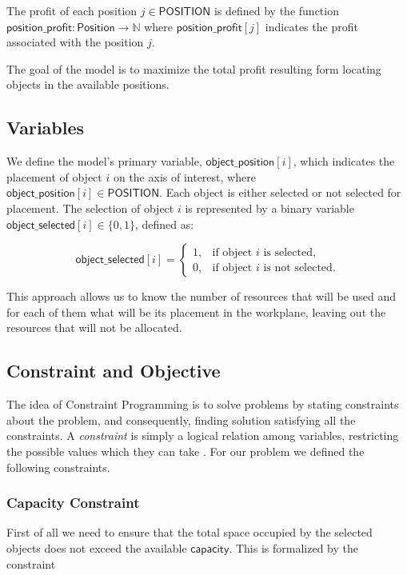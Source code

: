\documentclass[runningheads]{llncs}
\begin{document}
The profit of each position \(j \in \mathsf{POSITION}\) is defined by the function \\\(\mathsf{position\_profit} \colon \mathsf{Position} \to \mathbb{N}\) where \(\mathsf{position\_profit}[j]\) indicates the profit associated with the position \(j\).

The goal of the model is to maximize the total profit resulting form locating objects in the available positions.

\subsection{Variables}

We define the model's primary variable, \(\mathsf{object\_position}[i]\), which indicates the placement of object \(i\) on the axis of interest, where \(\mathsf{object\_position}[i] \in \mathsf{POSITION}\). Each object is either selected or not selected for placement. The selection of object \(i\) is represented by a binary variable \(\mathsf{object\_selected}[i] \in \{0, 1\}\), defined as:

\[
\mathsf{object\_selected}[i] =
\begin{cases}
	1, & \text{if object } i \text{ is selected}, \\
	0, & \text{if object } i \text{ is not selected}.
\end{cases}
\]

This approach allows us to know the number of resources that will be used and for each of them what will be its placement in the workplane, leaving out the resources that will not be allocated.

\subsection{Constraint and Objective}

The idea of Constraint Programming is to solve problems by stating constraints about the problem, and consequently, finding solution satisfying all the constraints. A \textit{constraint} is simply a logical relation among variables, restricting the possible values which they can take \cite{bartak1999constraint}. For our problem we defined the following constraints.

\subsubsection{Capacity Constraint} First of all we need to ensure that the total space occupied by the selected objects does not exceed the available \(\mathsf{capacity}\). This is formalized by the constraint
\end{document}
